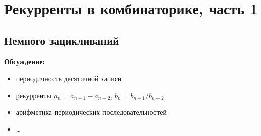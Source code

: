 

\section*{Рекурренты в комбинаторике, часть 1}



\subsection*{Немного зацикливаний}

\textbf{Обсуждение:}
\begin{itemize}
\item периодичность десятичной записи
\item рекурренты $a_n = a_{n-1} - a_{n-2}$, $b_n = b_{n-1} / b_{n-2}$
\item арифметика периодических последовательностей
\item \ldots
\end{itemize}

